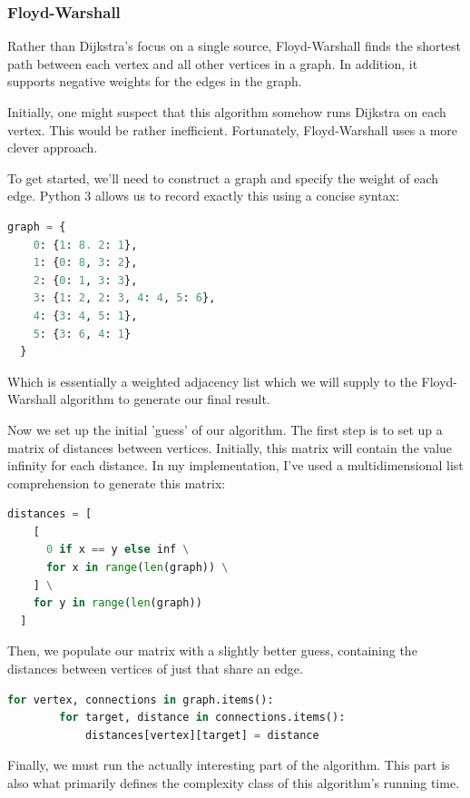 \documentclass{article}
\begin{document}
\subsubsection{Floyd-Warshall}
Rather than Dijkstra's focus on a single source, Floyd-Warshall finds the shortest path between each vertex and all other vertices in a graph. In addition, it supports negative weights for the edges in the graph.

Initially, one might suspect that this algorithm somehow runs Dijkstra on each vertex.
This would be rather inefficient. Fortunately, Floyd-Warshall uses a more clever approach.

To get started, we'll need to construct a graph and specify the weight of each edge.
Python 3 allows us to record exactly this using a concise syntax:

\begin{lstlisting}[language=Python]
  graph = {
    0: {1: 8. 2: 1},
    1: {0: 8, 3: 2},
    2: {0: 1, 3: 3},
    3: {1: 2, 2: 3, 4: 4, 5: 6},
    4: {3: 4, 5: 1},
    5: {3: 6, 4: 1}
  }
\end{lstlisting}

Which is essentially a weighted adjacency list which we will supply to the Floyd-Warshall algorithm to generate our final result.

Now we set up the initial 'guess' of our algorithm.
The first step is to set up a matrix of distances between vertices.
Initially, this matrix will contain the value infinity for each distance.
In my implementation, I've used a multidimensional list comprehension to generate this matrix:

\begin{lstlisting}[language=Python]
  distances = [
    [
      0 if x == y else inf \
      for x in range(len(graph)) \
    ] \
    for y in range(len(graph))
  ]
\end{lstlisting}

Then, we populate our matrix with a slightly better guess, containing the distances between vertices of just that share an edge.

\begin{lstlisting}[language=Python]
    for vertex, connections in graph.items():
        for target, distance in connections.items():
            distances[vertex][target] = distance
\end{lstlisting}

Finally, we must run the actually interesting part of the algorithm.
This part is also what primarily defines the complexity class of this algorithm's running time.
\end{document}
